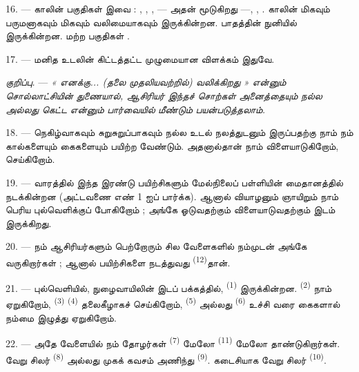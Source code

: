 16. --- காலின் பகுதிகள் இவை : , ,
,  — அதன் 
 மூடுகிறது —, , . காலின்
 மிகவும் பருமனாகவும் மிகவும் வலிமையாகவும் இருக்கின்றன.
பாதத்தின் நுனியில்  இருக்கின்றன. மற்ற பகுதிகள்
 .

17. --- மனித உடலின் கிட்டத்தட்ட முழுமையான விளக்கம் இதுவே.

\textit{குறிப்பு.} --- \textit{« எனக்கு... (தலை முதலியவற்றில்) வலிக்கிறது »}
\textit{என்னும் சொல்லாட்சியின் துணையால், ஆசிரியர் இந்தச் சொற்கள் அனைத்தையும்}
\textit{நல்ல அல்லது கெட்ட}  \textit{என்னும் பார்வையில்}
\textit{மீண்டும் பயன்படுத்தலாம்.}

\VUsaut{5.0mm}
\VUsaut{2.4mm}
\VUsaut{3.0mm}

18. --- நெகிழ்வாகவும் சுறுசுறுப்பாகவும் நல்ல உடல் நலத்துடனும் இருப்பதற்கு
நாம் நம் கால்களையும் கைகளையும் பயிற்ற வேண்டும். அதனால்தான் நாம்
விளையாடுகிறோம்,  செய்கிறோம்.

19. --- வாரத்தில் இந்த இரண்டு பயிற்சிகளும் மேல்நிலைப் பள்ளியின் மைதானத்தில்
நடக்கின்றன (அட்டவணை எண் 1 ஐப் பார்க்க). ஆனால் வியாழனும் ஞாயிறும் நாம் பெரிய
புல்வெளிக்குப் போகிறோம் ; அங்கே ஓடுவதற்கும் விளையாடுவதற்கும் இடம் இருக்கிறது.

20. --- நம் ஆசிரியர்களும் பெற்றோரும் சில வேளைகளில் நம்முடன் அங்கே
வருகிறார்கள் ; ஆனால் பயிற்சிகளை நடத்துவது \textsuperscript{(12)}தான்.

21. --- புல்வெளியில், நுழைவாயிலின் இடப் பக்கத்தில், \textsuperscript{(1)} இருக்கின்றன. \textsuperscript{(2)}
நாம் ஏறுகிறோம், \textsuperscript{(3)}
\textsuperscript{(4)} தலைகீழாகச் செய்கிறோம்,
\textsuperscript{(5)} அல்லது \textsuperscript{(6)} உச்சி வரை கைகளால் நம்மை இழுத்து ஏறுகிறோம்.

22. --- அதே வேளையில் நம் தோழர்கள் \textsuperscript{(7)}
மேலோ \textsuperscript{(11)} மேலோ தாண்டுகிறார்கள்.
வேறு சிலர் \textsuperscript{(8)} அல்லது
முகக் கவசம் அணிந்து  \textsuperscript{(9)}. கடைசியாக வேறு சிலர் \textsuperscript{(10)}.

